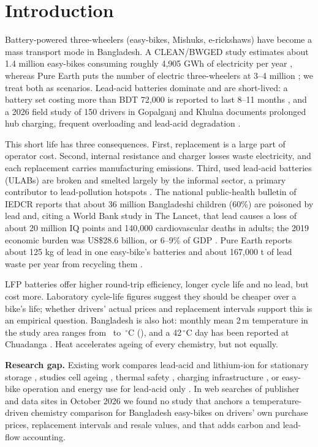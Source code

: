 \section{Introduction}
\label{sec:intro}
Battery-powered three-wheelers (easy-bikes, Mishuks, e-rickshaws) have become a mass transport mode in Bangladesh. A CLEAN/BWGED study estimates about 1.4 million easy-bikes consuming roughly 4{,}905 GWh of electricity per year \cite{clean2024}, whereas Pure Earth puts the number of electric three-wheelers at 3--4 million \cite{pureearth_smep}; we treat both as scenarios. Lead-acid batteries dominate \cite{mordor2026} and are short-lived: a battery set costing more than BDT 72{,}000 is reported to last 8--11 months \cite{fe2024}, and a 2026 field study of 150 drivers in Gopalganj and Khulna documents prolonged hub charging, frequent overloading and lead-acid degradation \cite{chowdhury2026}.

This short life has three consequences. First, replacement is a large part of operator cost. Second, internal resistance and charger losses waste electricity, and each replacement carries manufacturing emissions. Third, used lead-acid batteries (ULABs) are broken and smelted largely by the informal sector, a primary contributor to lead-pollution hotspots \cite{esdo2021}. The national public-health bulletin of IEDCR reports that about 36 million Bangladeshi children (60\%) are poisoned by lead and, citing a World Bank study in The Lancet, that lead causes a loss of about 20 million IQ points and 140{,}000 cardiovascular deaths in adults; the 2019 economic burden was US\$28.6 billion, or 6--9\% of GDP \cite{das2026}. Pure Earth reports about 125 kg of lead in one easy-bike's batteries and about 167{,}000 t of lead waste per year from recycling them \cite{fe2024,pureearth_smep}.

LFP batteries offer higher round-trip efficiency, longer cycle life and no lead, but cost more. Laboratory cycle-life figures suggest they should be cheaper over a bike's life; whether drivers' actual prices and replacement intervals support this is an empirical question. Bangladesh is also hot: monthly mean 2\,m temperature in the study area ranges from \Tmin\ to \Tmax\,$^\circ$C (), and a 42\,$^\circ$C day has been reported at Chuadanga \cite{heat2025}. Heat accelerates ageing of every chemistry, but not equally.

\textbf{Research gap.} Existing work compares lead-acid and lithium-ion for stationary storage \cite{keshan2016,yudhistira2022,jasper2025}, studies cell ageing \cite{yagci2026}, thermal safety \cite{schoberl2024}, charging infrastructure \cite{hasan2020}, or easy-bike operation and energy use for lead-acid only \cite{chowdhury2026,peakdemand}. In web searches of publisher and data sites in October 2026 we found no study that anchors a temperature-driven chemistry comparison for Bangladesh easy-bikes on drivers' own purchase prices, replacement intervals and resale values, and that adds carbon and lead-flow accounting. 

